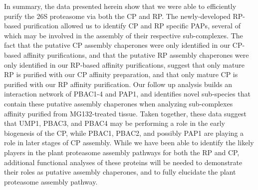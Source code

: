 \FloatBarrier

In summary, the data presented herein show that we were able to efficiently purify the 26S proteasome via both the CP and RP. The newly-developed RP-based purification allowed us to identify CP and RP specific PAPs, several of which may be involved in the assembly of their respective sub-complexes. The fact that the putative CP assembly chaperones were only identified in our CP-based affinity purifications, and that the putative RP assembly chaperones were only identified in our RP-based affinity purifications, suggest that only mature RP is purified with our CP affinity preparation, and that only mature CP is purified with our RP affinity purification. Our follow up analysis builds an interaction network of PBAC1-4 and PAP1, and identifies novel sub-species that contain these putative assembly chaperones when analyzing sub-complexes affinity purified from MG132-treated tissue. Taken together, these data suggest that UMP1, PBAC3, and PBAC4 may be performing a role in the early biogenesis of the CP, while PBAC1, PBAC2, and possibly PAP1 are playing a role in later stages of CP assembly. While we have been able to identify the likely players in the plant proteasome assembly pathways for both the RP and CP, additional functional analyses of these proteins will be needed to demonstrate their roles as putative assembly chaperones, and to fully elucidate the plant proteasome assembly pathway.  

\begin{singlespace}

\renewcommand\bibname{Literature Cited}

\end{singlespace}




